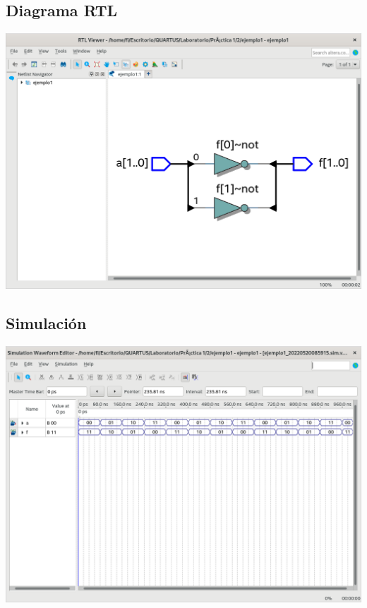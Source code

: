 \documentclass[10pt,a4paper]{article}
\begin{document}
	\subsection{Diagrama RTL}
	\begin{center}
		\includegraphics[scale=0.31]{RTL.png}
	\end{center}	

	\subsection{Simulación}
	\begin{center}
		\includegraphics[scale=0.35]{Simulacion.png}
	\end{center}
\end{document}
